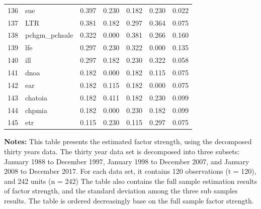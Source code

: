 \begin{footnotesize}
\begin{longtable}{rl|c|c|c|c|c}
  136 & sue & 0.397 & 0.230 & 0.182 & 0.230 & 0.022 \\ 
  137 & LTR & 0.381 & 0.182 & 0.297 & 0.364 & 0.075 \\ 
  138 & pchgm\_pchsale & 0.322 & 0.000 & 0.381 & 0.266 & 0.160 \\ 
  139 & lfe & 0.297 & 0.230 & 0.322 & 0.000 & 0.135 \\ 
  140 & ill & 0.297 & 0.182 & 0.230 & 0.322 & 0.058 \\ 
  141 & dnoa & 0.182 & 0.000 & 0.182 & 0.115 & 0.075 \\ 
  142 & ear & 0.182 & 0.115 & 0.182 & 0.000 & 0.075 \\ 
  143 & chatoia & 0.182 & 0.411 & 0.182 & 0.230 & 0.099 \\ 
  144 & chpmia & 0.182 & 0.000 & 0.230 & 0.182 & 0.099 \\ 
  145 & etr & 0.115 & 0.230 & 0.115 & 0.297 & 0.075 \\ 
   \hline
	\end{longtable}
			\begin{minipage}{\textwidth}
	{\footnotesize {\bf Notes:}	This table presents the estimated factor strength, using the decomposed thirty years data.
	The thirty year data set is decomposed into three subsets: January 1988 to December 1997, January 1998 to December 2007, and January 2008 to December 2017. For each data set, it contains 120 observations (t = 120), and 242 units (n = 242)
The table also contains the full sample estimation results of factor strength, and the standard deviation among the three sub samples results.
The table is ordered decreasingly base on the full sample factor strength.}
\end{minipage}
\end{footnotesize}




